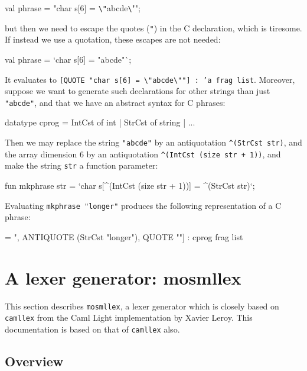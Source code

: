 \documentclass[fleqn,a4paper]{article}
\begin{document}
\begin{program}
val phrase = "char s[6] = \verb#\"#abcde\verb#\#"";
\end{program}

\noindent but then we need to escape the quotes ({\tt "}) in the C
declaration, which is tiresome.  If instead we use a quotation, these
escapes are not needed:

\begin{program}
val phrase = `char s[6] = "abcde"`;
\end{program}

\noindent It evaluates to {\tt [QUOTE "char s[6] =
  \verb#\"#abcde\verb#\#""] :\ 'a frag list}.  Moreover, suppose we
want to generate such declarations for other strings than just {\tt
  "abcde"}, and that we have an abstract syntax for C phrases:

\begin{program}
datatype cprog =
    IntCst of int
  | StrCst of string
  | ...  
\end{program}

\noindent Then we may replace the string {\tt "abcde"} by an
antiquotation {\tt \verb#^#(StrCst str)}, and the array dimension 6 by
an antiquotation {\tt \verb#^#(IntCst (size str + 1))}, and make the
string {\tt str} a function parameter:

\begin{program}
fun mkphrase str = `char s[^(IntCst (size str + 1))] = ^(StrCst str)`;
\end{program}

\noindent Evaluating {\tt mkphrase "longer"} produces the following
representation of a C phrase:

\begin{program}
[QUOTE "char s[", ANTIQUOTE (IntCst 7), QUOTE "] = ", 
 ANTIQUOTE (StrCst "longer"), QUOTE ""] : cprog frag list
\end{program}


\newpage

\section{A lexer generator: mosmllex}
\label{sec-mosmllex}

This section describes {\tt mosmllex}, a lexer generator which is
closely based on {\tt camllex} from the Caml Light implementation by
Xavier Leroy.  This documentation is based on that of {\tt camllex}
also.  


\subsection{Overview}
\end{document}
